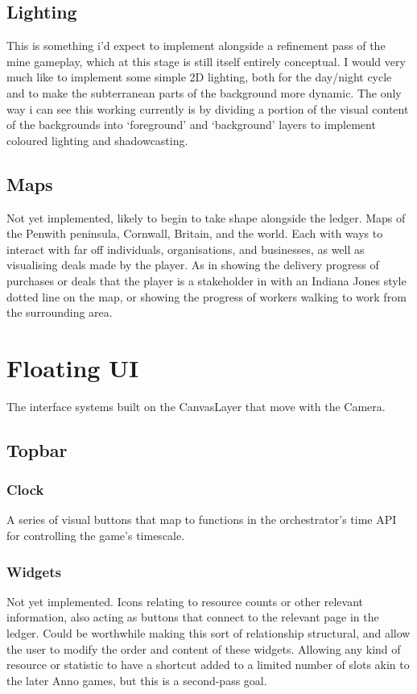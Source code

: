 \documentclass[12pt, a4paper]{scrreprt}
\begin{document}
	\subsection{Lighting}
	This is something i'd expect to implement alongside a refinement pass of the mine gameplay, which at this stage is still itself entirely conceptual. I would very much like to implement some simple 2D lighting, both for the day/night cycle and to make the subterranean parts of the background more dynamic. The only way i can see this working currently is by dividing a portion of the visual content of the backgrounds into `foreground' and `background' layers to implement coloured lighting and shadowcasting.
	\subsection{Maps}
	Not yet implemented, likely to begin to take shape alongside the ledger. Maps of the Penwith peninsula, Cornwall, Britain, and the world. Each with ways to interact with far off individuals, organisations, and businesses, as well as visualising deals made by the player. As in showing the delivery progress of purchases or deals that the player is a stakeholder in with an Indiana Jones style dotted line on the map, or showing the progress of workers walking to work from the surrounding area.
	\section{Floating UI}
	The interface systems built on the CanvasLayer that move with the Camera.
	\subsection{Topbar}
	\subsubsection{Clock}
	A series of visual buttons that map to functions in the orchestrator's time API for controlling the game's timescale.
	\subsubsection{Widgets}
	Not yet implemented. Icons relating to resource counts or other relevant information, also acting as buttons that connect to the relevant page in the ledger. Could be worthwhile making this sort of relationship structural, and allow the user to modify the order and content of these widgets. Allowing any kind of resource or statistic to have a shortcut added to a limited number of slots akin to the later Anno games, but this is a second-pass goal.
\end{document}
